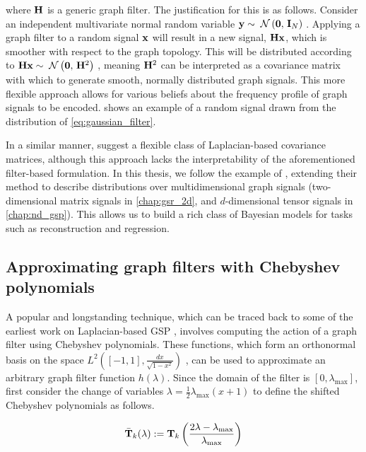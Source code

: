 where $\mathbf{H}$ is a generic graph filter. The justification for this is as follows. Consider an independent multivariate normal random variable $\mathbf{y} \sim \; \mathcal{N}\left(\mathbf{0}, \, \mathbf{I}_N\right) \;$. Applying a graph filter to a random signal $\mathbf{x}$ will result in a new signal, $\mathbf{H} \mathbf{x}$, which is smoother with respect to the graph topology. This will be distributed according to $\mathbf{H} \mathbf{x} \sim \; \mathcal{N}\left(\mathbf{0}, \, \mathbf{H}^2\right) \;$, meaning $\mathbf{H}^2$ can be interpreted as a covariance matrix with which to generate smooth, normally distributed graph signals. This more flexible approach allows for various beliefs about the frequency profile of graph signals to be encoded.  shows an example of a random signal drawn from the distribution of \cref{eq:gaussian_filter}. 

In a similar manner, \citep{Perraudin2017} suggest a flexible class of Laplacian-based covariance matrices, although this approach lacks the interpretability of the aforementioned filter-based formulation. In this thesis, we follow the example of \cite{Venkitaraman2020}, extending their method to describe distributions over multidimensional graph signals (two-dimensional matrix signals in \cref{chap:gsr_2d}, and $d$-dimensional tensor signals in \cref{chap:nd_gsp}). This allows us to build a rich class of Bayesian models for tasks such as reconstruction and regression. 

\subsection{Approximating graph filters with Chebyshev polynomials}

A popular and longstanding technique, which can be traced back to some of the earliest work on Laplacian-based GSP \citep{Hammond2011}, involves computing the action of a graph filter using Chebyshev polynomials. These functions, which form an orthonormal basis on the space $L^2 \left([-1, 1], \frac{dx}{\sqrt{1 - x^2}}\right)$ \citep{Mason2002}, can be used to approximate an arbitrary graph filter function $h(\lambda)$. Since the domain of the filter is $[0, \lambda_{\text{max}}]$, first consider the change of variables $\lambda = \frac{1}{2}\lambda_{\text{max}}(x + 1)$ to define the shifted Chebyshev polynomials as follows. 

\begin{equation}
    \bar{\mathbf{T}}_k(\lambda) := \mathbf{T}_{k}\left(\frac{2\lambda - \lambda_{\text{max}}}{\lambda_{\text{max}}}\right)
\end{equation}

